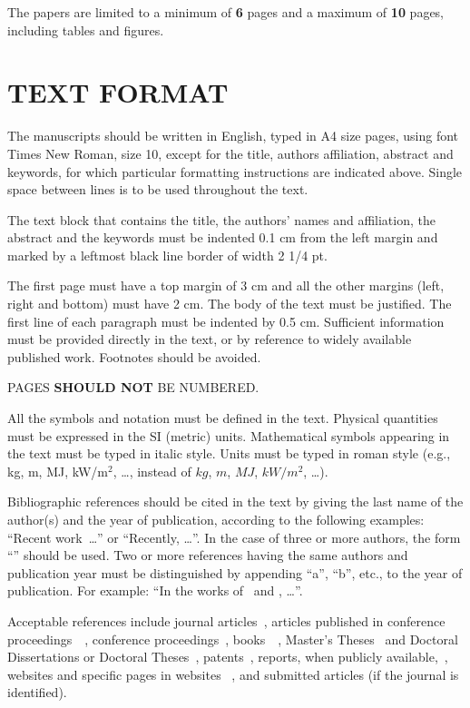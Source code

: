 \documentclass[10pt,fleqn,a4paper,twoside]{article}
\begin{document}
The papers are limited to a minimum of {\bf 6} pages and a maximum of {\bf 10} pages, including tables and figures. 

\section{TEXT FORMAT}

The manuscripts should be written in English, typed in A4 size pages, using font Times New Roman, size 10, except for the title, authors affiliation, abstract and keywords, for which particular formatting instructions are indicated above. Single space between lines is to be used throughout the text.

The text block that contains the title, the authors' names and affiliation, the abstract and the keywords must be indented 0.1 cm from the left margin and marked by a leftmost black line border of width 2 1/4 pt.

The first page must have a top margin of 3 cm and all the other margins (left, right and bottom) must have 2 cm. The body of the text must be justified. The first line of each paragraph must be indented by 0.5 cm. Sufficient information must be provided directly in the text, or by reference to widely available published work. Footnotes should be avoided. 

{\color{red} PAGES {\bf SHOULD NOT} BE NUMBERED.}

All the symbols and notation must be defined in the text. Physical quantities must be expressed in the SI (metric) units. Mathematical symbols appearing in the text must be typed in italic style. Units must be typed in roman style (e.g., kg, m, MJ, kW/m$^2$, \dots, instead of $kg$, $m$, $MJ$, $kW / m^2$, \dots). 

Bibliographic references should be cited in the text by giving the last name of the author(s) and the year of publication, according to the following examples: ``Recent work~\citep{Simas2019}\dots'' or ``Recently, \citet{Simas2019}\dots''. In the case of three or more authors, the form ``\citep{Bravo2018}'' should be used. Two or more references having the same authors and publication year must be distinguished by appending ``a'', ``b'', etc., to the year of publication. For example: ``In the works of~\citet{Santos2013a} and \citet{Santos2013b}, \dots''.

Acceptable references include journal articles~\citep{Bravo2018}, articles published in conference proceedings~\citep{Santos2013a}~\citep{Santos2013b}, conference proceedings~\citep{Carvalho2017}, books~\citep{MendoncaFancello2019}~, Master's Theses~\citep{Campos2018} and Doctoral Dissertations or Doctoral Theses~\citep{Grando2017}, patents~\citep{Fernandes2018}, reports, when publicly available,~\citep{EPE2020}, websites and specific pages in websites ~\citep{MLA20}, and submitted articles (if the journal is identified).
\end{document}
